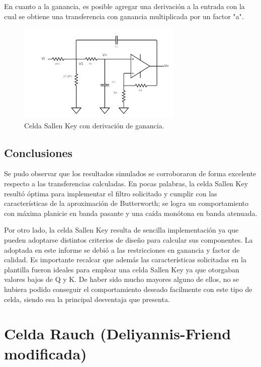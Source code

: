 En cuanto a la ganancia, es posible agregar una derivación a la entrada con la cual se obtiene una transferencia con ganancia multiplicada por un factor "a".

\begin{figure}[H]
    \centering
        \includegraphics[width= 0.7\textwidth]{../Ejercicio2-DisenoDeCeldas/1CeldaSallenKey/images/SallenKeyGain.png}
    \caption{Celda Sallen Key con derivación de ganancia.}
    \label{fig:SKGain}
\end{figure}


\subsection{Conclusiones}

Se pudo observar que los resultados simulados se corroboraron de forma excelente respecto a las transferencias calculadas. En pocas palabras, la celda Sallen Key resultó óptima para implementar el filtro solicitado y cumplir con las características de la aproximación de Butterworth; se logra un comportamiento con máxima planicie en banda pasante y una caída monótona en banda atenuada. 

Por otro lado, la celda Sallen Key resulta de sencilla implementación ya que pueden adoptarse distintos criterios de diseño para calcular sus componentes. La adoptada en este informe se debió a las restricciones en ganancia y factor de calidad. Es importante recalcar que además las características solicitadas en la plantilla fueron ideales para emplear una celda Sallen Key ya que otorgaban valores bajos de Q y K. De haber sido mucho mayores alguno de ellos, no se hubiera podido conseguir el comportamiento deseado facilmente con este tipo de celda, siendo esa la principal desventaja que presenta. 


\section{Celda Rauch (Deliyannis-Friend modificada)}

